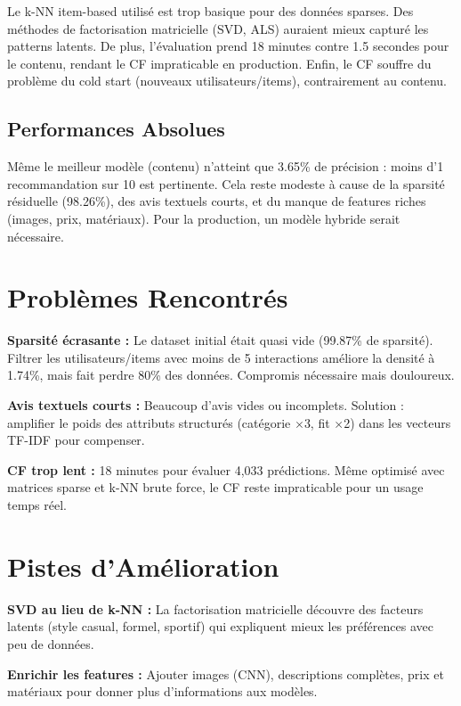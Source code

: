 \documentclass[12pt,a4paper]{article}
\begin{document}
Le k-NN item-based utilisé est trop basique pour des données sparses. Des méthodes de factorisation matricielle (SVD, ALS) auraient mieux capturé les patterns latents. De plus, l'évaluation prend 18 minutes contre 1.5 secondes pour le contenu, rendant le CF impraticable en production. Enfin, le CF souffre du problème du cold start (nouveaux utilisateurs/items), contrairement au contenu.

\subsection{Performances Absolues}

Même le meilleur modèle (contenu) n'atteint que 3.65\% de précision : moins d'1 recommandation sur 10 est pertinente. Cela reste modeste à cause de la sparsité résiduelle (98.26\%), des avis textuels courts, et du manque de features riches (images, prix, matériaux). Pour la production, un modèle hybride serait nécessaire.

\section{Problèmes Rencontrés}

\textbf{Sparsité écrasante :} Le dataset initial était quasi vide (99.87\% de sparsité). Filtrer les utilisateurs/items avec moins de 5 interactions améliore la densité à 1.74\%, mais fait perdre 80\% des données. Compromis nécessaire mais douloureux.

\textbf{Avis textuels courts :} Beaucoup d'avis vides ou incomplets. Solution : amplifier le poids des attributs structurés (catégorie $\times$3, fit $\times$2) dans les vecteurs TF-IDF pour compenser.

\textbf{CF trop lent :} 18 minutes pour évaluer 4,033 prédictions. Même optimisé avec matrices sparse et k-NN brute force, le CF reste impraticable pour un usage temps réel.

\section{Pistes d'Amélioration}

\textbf{SVD au lieu de k-NN :} La factorisation matricielle découvre des facteurs latents (style casual, formel, sportif) qui expliquent mieux les préférences avec peu de données.

\textbf{Enrichir les features :} Ajouter images (CNN), descriptions complètes, prix et matériaux pour donner plus d'informations aux modèles.
\end{document}
